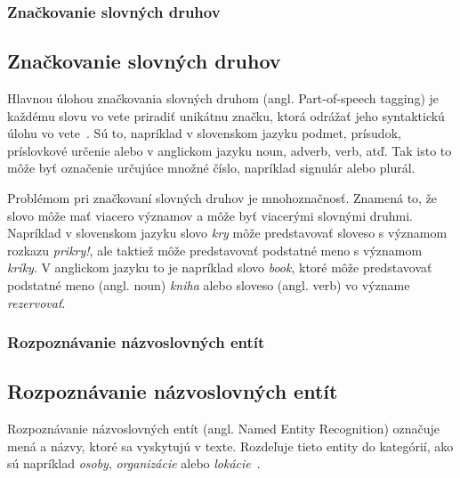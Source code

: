 %
%
{
	\subsubsection{Značkovanie slovných druhov}
}
{
	\subsection{Značkovanie slovných druhov}
}
\label{subsubsec:postagging}
Hlavnou úlohou značkovania slovných druhom (angl. Part-of-speech tagging) je každému slovu vo vete priradiť unikátnu značku, ktorá odrážať jeho syntaktickú úlohu vo vete~\cite{collobert2011}. Sú to, napríklad v slovenskom jazyku podmet, prísudok, príslovkové určenie alebo v anglickom jazyku noun, adverb, verb, atď. Tak isto to môže byť označenie určujúce množné číslo, napríklad signulár alebo plurál.

Problémom pri značkovaní slovných druhov je mnohoznačnosť. Znamená to, že slovo môže mať viacero významov a môže byť viacerými slovnými druhmi. Napríklad v slovenskom jazyku slovo \textit{kry} môže predstavovať sloveso s významom rozkazu \textit{prikry!}, ale taktiež môže predstavovať podstatné meno s významom \textit{kríky}. V anglickom jazyku to je napríklad slovo \textit{book}, ktoré môže predstavovať podstatné meno (angl. noun) \textit{kniha} alebo sloveso (angl. verb) vo význame \textit{rezervovať}.

%
%
{
	\subsubsection{Rozpoznávanie názvoslovných entít}
}
{
	\subsection{Rozpoznávanie názvoslovných entít}
}
\label{subsubsec:ner}
Rozpoznávanie názvoslovných entít (angl. Named Entity Recognition) označuje mená a názvy, ktoré sa vyskytujú v texte. Rozdeľuje tieto entity do kategórií, ako sú napríklad \textit{osoby}, \textit{organizácie} alebo \textit{lokácie}~\cite{collobert2011}.

